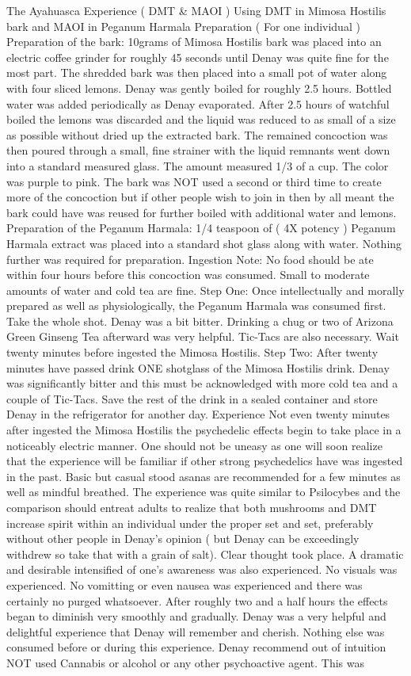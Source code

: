 \documentclass[12pt]{book}
\begin{document}
The Ayahuasca Experience ( DMT \& MAOI ) Using DMT in Mimosa Hostilis bark and MAOI in Peganum Harmala Preparation ( For one individual ) Preparation of the bark: 10grams of Mimosa Hostilis bark was placed into an electric coffee grinder for roughly 45 seconds until Denay was quite fine for the most part. The shredded bark was then placed into a small pot of water along with four sliced lemons. Denay was gently boiled for roughly 2.5 hours. Bottled water was added periodically as Denay evaporated. After 2.5 hours of watchful boiled the lemons was discarded and the liquid was reduced to as small of a size as possible without dried up the extracted bark. The remained concoction was then poured through a small, fine strainer with the liquid remnants went down into a standard measured glass. The amount measured 1/3 of a cup. The color was purple to pink. The bark was NOT used a second or third time to create more of the concoction but if other people wish to join in then by all meant the bark could have was reused for further boiled with additional water and lemons. Preparation of the Peganum Harmala: 1/4 teaspoon of ( 4X potency ) Peganum Harmala extract was placed into a standard shot glass along with water. Nothing further was required for preparation. Ingestion Note: No food should be ate within four hours before this concoction was consumed. Small to moderate amounts of water and cold tea are fine. Step One: Once intellectually and morally prepared as well as physiologically, the Peganum Harmala was consumed first. Take the whole shot. Denay was a bit bitter. Drinking a chug or two of Arizona Green Ginseng Tea afterward was very helpful. Tic-Tacs are also necessary. Wait twenty minutes before ingested the Mimosa Hostilis. Step Two: After twenty minutes have passed drink ONE shotglass of the Mimosa Hostilis drink. Denay was significantly bitter and this must be acknowledged with more cold tea and a couple of Tic-Tacs. Save the rest of the drink in a sealed container and store Denay in the refrigerator for another day. Experience Not even twenty minutes after ingested the Mimosa Hostilis the psychedelic effects begin to take place in a noticeably electric manner. One should not be uneasy as one will soon realize that the experience will be familiar if other strong psychedelics have was ingested in the past. Basic but casual stood asanas are recommended for a few minutes as well as mindful breathed. The experience was quite similar to Psilocybes and the comparison should entreat adults to realize that both mushrooms and DMT increase spirit within an individual under the proper set and set, preferably without other people in Denay's opinion ( but Denay can be exceedingly withdrew so take that with a grain of salt). Clear thought took place. A dramatic and desirable intensified of one's awareness was also experienced. No visuals was experienced. No vomitting or even nausea was experienced and there was certainly no purged whatsoever. After roughly two and a half hours the effects began to diminish very smoothly and gradually. Denay was a very helpful and delightful experience that Denay will remember and cherish. Nothing else was consumed before or during this experience. Denay recommend out of intuition NOT used Cannabis or alcohol or any other psychoactive agent. This was 
\end{document}
